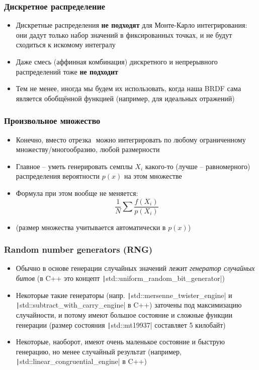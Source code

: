 \documentclass[10pt]{beamer}
\begin{document}
\begin{frame}[fragile]
\frametitle{Дискретное распределение}
\begin{itemize}
\item Дискретные распределения \textbf{не подходят} для Монте-Карло интегрирования: они дадут только набор значений в фиксированных точках, и не будут сходиться к искомому интегралу
\pause
\item Даже смесь (аффинная комбинация) дискретного и непрерывного распределений тоже \textbf{не подходит}
\pause
\item Тем не менее, иногда мы будем их использовать, когда наша BRDF сама является обобщённой функцией (например, для идеальных отражений)
\end{itemize}
\end{frame}

\begin{frame}[fragile]
\frametitle{Произвольное множество}
\begin{itemize}
\item Конечно, вместо отрезка \begin{math}[a,b]\end{math} можно интегрировать по любому ограниченному множеству/многообразию, любой размерности
\pause
\item Главное -- уметь генерировать семплы \begin{math}X_i\end{math} какого-то (лучше -- равномерного) распределения вероятности \begin{math}p(x)\end{math} на этом множестве
\pause
\item Формула при этом вообще не меняется:
\begin{equation*}
\frac{1}{N}\sum \frac{f(X_i)}{p(X_i)}
\end{equation*}
\pause
\item (размер множества учитывается автоматически в \begin{math}p(x)\end{math})
\end{itemize}
\end{frame}

\begin{frame}[fragile]
\frametitle{Random number generators (RNG)}
\begin{itemize}
\item Обычно в основе генерации случайных значений лежит \textit{генератор случайных битов} (в C++ это концепт \texttt|std::uniform_random_bit_generator|)
\pause
\item Некоторые такие генераторы (напр. \texttt|std::mersenne_twister_engine| и \texttt|std::subtract_with_carry_engine| в C++) заточены под максимизацию случайности, и потому имеют большое состояние и сложные функции генерации (размер состояния \texttt|std::mt19937| составляет 5 килобайт)
\pause
\item Некоторые, наоборот, имеют очень маленькое состояние и быструю генерацию, но менее случайный результат (например, \texttt|std::linear_congruential_engine| в C++)
\end{itemize}
\end{frame}
\end{document}
